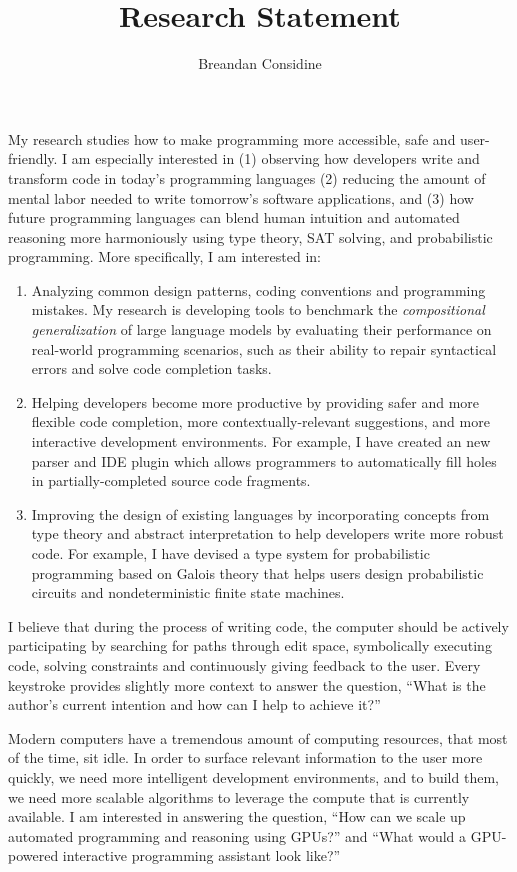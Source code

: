 \documentclass[11pt]{article}
\begin{document}
    \title{Research Statement}
    \author{Breandan Considine}
    \maketitle
    My research studies how to make programming more accessible, safe and user-friendly. I am especially interested in (1) observing how developers write and transform code in today's programming languages (2) reducing the amount of mental labor needed to write tomorrow's software applications, and (3) how future programming languages can blend human intuition and automated reasoning more harmoniously using type theory, SAT solving, and probabilistic programming. More specifically, I am interested in:

    \begin{enumerate}
        \item Analyzing common design patterns, coding conventions and programming mistakes. My research is developing tools to benchmark the \textit{compositional generalization} of large language models by evaluating their performance on real-world programming scenarios, such as their ability to repair syntactical errors and solve code completion tasks.
        \item Helping developers become more productive by providing safer and more flexible code completion, more contextually-relevant suggestions, and more interactive development environments. For example, I have created an new parser and IDE plugin which allows programmers to automatically fill holes in partially-completed source code fragments.
        \item Improving the design of existing languages by incorporating concepts from type theory and abstract interpretation to help developers write more robust code. For example, I have devised a type system for probabilistic programming based on Galois theory that helps users design probabilistic circuits and nondeterministic finite state machines.
    \end{enumerate}

    I believe that during the process of writing code, the computer should be actively participating by searching for paths through edit space, symbolically executing code, solving constraints and continuously giving feedback to the user. Every keystroke provides slightly more context to answer the question, ``What is the author's current intention and how can I help to achieve it?''

   Modern computers have a tremendous amount of computing resources, that most of the time, sit idle. In order to surface relevant information to the user more quickly, we need more intelligent development environments, and to build them, we need more scalable algorithms to leverage the compute that is currently available. I am interested in answering the question, ``How can we scale up automated programming and reasoning using GPUs?'' and ``What would a GPU-powered interactive programming assistant look like?''
\end{document}
